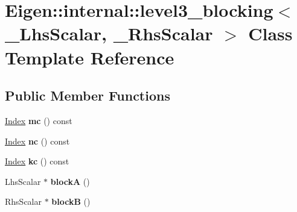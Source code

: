 \hypertarget{class_eigen_1_1internal_1_1level3__blocking}{}\section{Eigen\+:\+:internal\+:\+:level3\+\_\+blocking$<$ \+\_\+\+Lhs\+Scalar, \+\_\+\+Rhs\+Scalar $>$ Class Template Reference}
\label{class_eigen_1_1internal_1_1level3__blocking}
\subsection*{Public Member Functions}
\begin{DoxyCompactItemize}
\item 
\mbox{\label{class_eigen_1_1internal_1_1level3__blocking_a42652281565b0d88009c6a2c69a61b90}} 
\hyperlink{namespace_eigen_a62e77e0933482dafde8fe197d9a2cfde}{Index} {\bfseries mc} () const
\item 
\mbox{\label{class_eigen_1_1internal_1_1level3__blocking_a967d4f0e4ac537497481e18ebb229ae2}} 
\hyperlink{namespace_eigen_a62e77e0933482dafde8fe197d9a2cfde}{Index} {\bfseries nc} () const
\item 
\mbox{\label{class_eigen_1_1internal_1_1level3__blocking_a2348863b8e4618d9cf28ac3274320959}} 
\hyperlink{namespace_eigen_a62e77e0933482dafde8fe197d9a2cfde}{Index} {\bfseries kc} () const
\item 
\mbox{\label{class_eigen_1_1internal_1_1level3__blocking_ad918c2b9d73b2cc6134446cf36a500ae}} 
Lhs\+Scalar $\ast$ {\bfseries blockA} ()
\item 
\mbox{\label{class_eigen_1_1internal_1_1level3__blocking_a10666dbe23e34516bc9f8221fcd53ad0}} 
Rhs\+Scalar $\ast$ {\bfseries blockB} ()
\item 
\mbox{\label{class_eigen_1_1internal_1_1level3__blocking_a42652281565b0d88009c6a2c69a61b90}} 

\end{DoxyCompactItemize}
